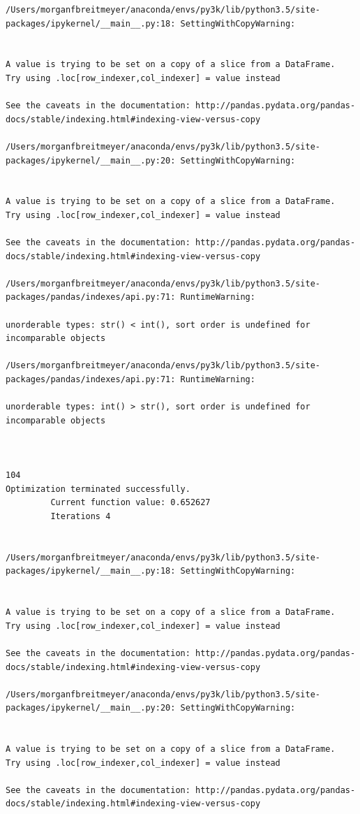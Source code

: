 \begin{lstlisting}
/Users/morganfbreitmeyer/anaconda/envs/py3k/lib/python3.5/site-packages/ipykernel/__main__.py:18: SettingWithCopyWarning:


A value is trying to be set on a copy of a slice from a DataFrame.
Try using .loc[row_indexer,col_indexer] = value instead

See the caveats in the documentation: http://pandas.pydata.org/pandas-docs/stable/indexing.html#indexing-view-versus-copy

/Users/morganfbreitmeyer/anaconda/envs/py3k/lib/python3.5/site-packages/ipykernel/__main__.py:20: SettingWithCopyWarning:


A value is trying to be set on a copy of a slice from a DataFrame.
Try using .loc[row_indexer,col_indexer] = value instead

See the caveats in the documentation: http://pandas.pydata.org/pandas-docs/stable/indexing.html#indexing-view-versus-copy

/Users/morganfbreitmeyer/anaconda/envs/py3k/lib/python3.5/site-packages/pandas/indexes/api.py:71: RuntimeWarning:

unorderable types: str() < int(), sort order is undefined for incomparable objects

/Users/morganfbreitmeyer/anaconda/envs/py3k/lib/python3.5/site-packages/pandas/indexes/api.py:71: RuntimeWarning:

unorderable types: int() > str(), sort order is undefined for incomparable objects



104
Optimization terminated successfully.
         Current function value: 0.652627
         Iterations 4


/Users/morganfbreitmeyer/anaconda/envs/py3k/lib/python3.5/site-packages/ipykernel/__main__.py:18: SettingWithCopyWarning:


A value is trying to be set on a copy of a slice from a DataFrame.
Try using .loc[row_indexer,col_indexer] = value instead

See the caveats in the documentation: http://pandas.pydata.org/pandas-docs/stable/indexing.html#indexing-view-versus-copy

/Users/morganfbreitmeyer/anaconda/envs/py3k/lib/python3.5/site-packages/ipykernel/__main__.py:20: SettingWithCopyWarning:


A value is trying to be set on a copy of a slice from a DataFrame.
Try using .loc[row_indexer,col_indexer] = value instead

See the caveats in the documentation: http://pandas.pydata.org/pandas-docs/stable/indexing.html#indexing-view-versus-copy


\end{lstlisting}

